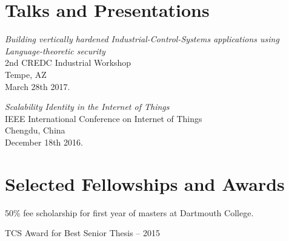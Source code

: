 \documentclass[letterpaper,10pt]{article}
\renewenvironment{itemize}{
  \begin{list}{}{
    \setlength{\leftmargin}{1.5em}
  }
}{
  \end{list}
}
\begin{document}
\section*{Talks and Presentations}
\begin{itemize}
\setlength\itemsep{0ex}
\item \textit{Building vertically hardened Industrial-Control-Systems applications using Language-theoretic security}\\ 2nd CREDC Industrial Workshop\\ Tempe, AZ\\ March 28th 2017.
\item \textit{Scalability Identity in the Internet of Things}\\ IEEE International Conference on Internet of Things\\ Chengdu, China\\ December 18th 2016.
\end{itemize}

\section*{Selected Fellowships and Awards}
\setlength\itemsep{0ex}
\begin {itemize}
\setlength\itemsep{0ex}
\item 50\% fee scholarship for first year of masters at Dartmouth College. 
\item TCS Award for Best Senior Thesis -- 2015
\end{itemize}
\end{document}
